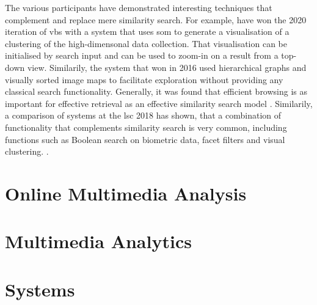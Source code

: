 The various participants have demonstrated interesting techniques that complement and replace mere similarity search. For example, \cite{Kratochvil:2020SOM} have won the 2020 iteration of \acrshort{vbs} with a system that uses \acrfull{som} \cite{Kohonen:1990Self} to generate a visualisation of a clustering of the high-dimensonal data collection. That visualisation can be initialised by search input and can be used to zoom-in on a result from a top-down view. Similarily, the system that won in 2016 used \cite{Barthel:2016Navigating} hierarchical graphs and visually sorted image maps to facilitate exploration without providing any classical search functionality. Generally, it was found that efficient browsing is as important for effective retrieval as an effective similarity search model \cite{Lokovc:2019Interactive}. Similarily, a comparison of systems at the \acrshort{lsc} 2018 has shown, that a combination of functionality that complements similarity search is very common, including functions such as Boolean search on biometric data, facet filters and visual clustering. \cite{Gurrin:2019Invited}.



\section{Online Multimedia Analysis}

\section{Multimedia Analytics}

\section{Systems}